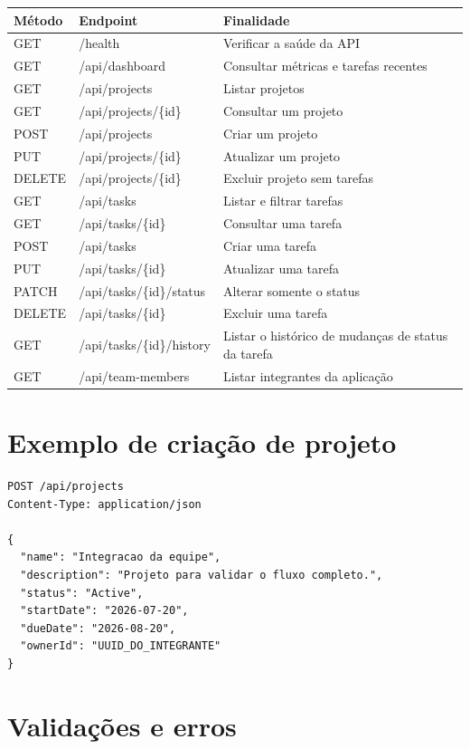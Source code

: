 \documentclass[12pt,a4paper,openany]{report}
\begin{document}
\begin{longtable}{>{\ttfamily}p{} >{\ttfamily}p{} p{}}
\toprule
\normalfont\textbf{Método} & \normalfont\textbf{Endpoint} & \normalfont\textbf{Finalidade} \\
\midrule
\endhead
GET & /health & Verificar a saúde da API \\
GET & /api/dashboard & Consultar métricas e tarefas recentes \\
GET & /api/projects & Listar projetos \\
GET & /api/projects/\{id\} & Consultar um projeto \\
POST & /api/projects & Criar um projeto \\
PUT & /api/projects/\{id\} & Atualizar um projeto \\
DELETE & /api/projects/\{id\} & Excluir projeto sem tarefas \\
GET & /api/tasks & Listar e filtrar tarefas \\
GET & /api/tasks/\{id\} & Consultar uma tarefa \\
POST & /api/tasks & Criar uma tarefa \\
PUT & /api/tasks/\{id\} & Atualizar uma tarefa \\
PATCH & /api/tasks/\{id\}/status & Alterar somente o status \\
DELETE & /api/tasks/\{id\} & Excluir uma tarefa \\
GET & /api/tasks/\{id\}/history & Listar o histórico de mudanças de status da tarefa \\
GET & /api/team-members & Listar integrantes da aplicação \\
\bottomrule
\end{longtable}

\section{Exemplo de criação de projeto}

\begin{lstlisting}
POST /api/projects
Content-Type: application/json

{
  "name": "Integracao da equipe",
  "description": "Projeto para validar o fluxo completo.",
  "status": "Active",
  "startDate": "2026-07-20",
  "dueDate": "2026-08-20",
  "ownerId": "UUID_DO_INTEGRANTE"
}
\end{lstlisting}

\section{Validações e erros}
\end{document}
